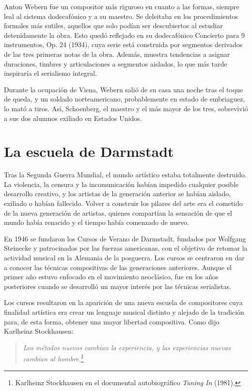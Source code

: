 	Anton Webern fue un compositor más riguroso en cuanto a las formas, siempre leal al sistema dodecafónico y a su maestro. Se deleitaba en los procedimientos formales más sutiles, aquellos que solo podían ser descubiertos al estudiar detenidamente la obra. Esto quedó reflejado en su dodecafónico Concierto para 9 instrumentos, Op. 24 (1934), cuya serie está construida por segmentos derivados de las tres primeras notas de la obra. Además, muestra tendencias a asignar duraciones, timbres y articulaciones a segmentos aislados, lo que más tarde inspiraría el serialismo integral.
        
	Durante la ocupación de Viena, Webern salió de su casa una noche tras el toque de queda, y un soldado norteamericano, probablemente en estado de embriaguez, lo mató a tiros. Así, Schoenberg, el maestro y el más mayor de los tres, sobrevivió a sus dos alumnos exiliado en Estados Unidos.
    
	\section{La escuela de Darmstadt}
	Tras la Segunda Guerra Mundial, el mundo artístico estaba totalmente destruido. La violencia, la censura y la incomunicación habían impedido cualquier posible desarrollo creativo, y los artistas de la generación anterior se habían aislado, exiliado o habían fallecido. Volver a construir los pilares del arte era el cometido de la nueva generación de artistas, quienes compartían la sensación de que el mundo había renacido y el tiempo había comenzado de nuevo.
	
	En 1946 se fundaron los Cursos de Verano de Darmstadt, fundados por Wolfgang Steinecke y patrocinados por las fuerzas americanas, con el objetivo de retomar la actividad musical en la Alemania de la posguerra. Los cursos se centraron en dar a conocer las técnicas compositivas de las generaciones anteriores. Aunque el primer año estuvo enfocado en el movimiento neoclásico, fue en los años posteriores cuando se desarrolló un mayor interés por las técnicas serialistas.
	
	Los cursos resultaron en la aparición de una nueva escuela de compositores cuya finalidad artística era crear un lenguaje musical distinto y alejado de la tradición para, de esta forma, obtener una mayor libertad compositiva. Como dijo Karlheinz Stockhausen:
	
	\begin{quote}
		\textit{Los métodos nuevos cambian la experiencia, y las experiencias nuevas cambian al hombre.}\footnote{Karlheinz Stockhausen en el documental autobiográfico \textit{Tuning In} (1981).}
	\end{quote}
	
